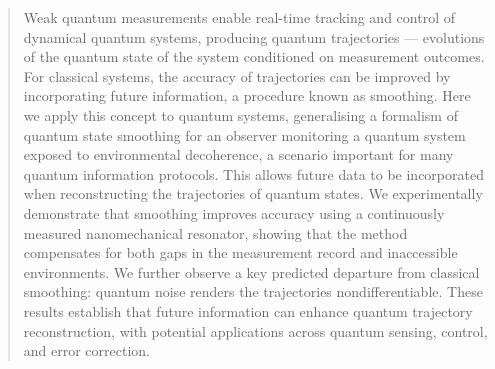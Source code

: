 \documentclass[aps,prx,twocolumn,amsmath,amssymb,superscriptaddress,floatfix,longbibliography
]{revtex4-2}
\begin{document}

\begin{abstract}
Weak quantum measurements enable real-time tracking and control of dynamical quantum systems, producing quantum trajectories --- evolutions of the quantum state of the system conditioned on measurement outcomes. For classical systems, the accuracy of trajectories can be improved by incorporating future information, a procedure known as smoothing. Here we apply this concept to quantum systems, generalising a formalism of quantum state smoothing for an observer monitoring a quantum system exposed to environmental decoherence, a scenario important for many quantum information protocols. This allows future data to be incorporated when reconstructing the trajectories of quantum states. We experimentally demonstrate that smoothing improves accuracy using a continuously measured nanomechanical resonator, showing that the method compensates for both gaps in the measurement record and inaccessible environments. We further observe a key predicted departure from classical smoothing: quantum noise renders the trajectories nondifferentiable. These results establish that future information can enhance quantum trajectory reconstruction, with potential applications across quantum sensing, control, and error correction.
\end{abstract}


\maketitle
\end{document}
